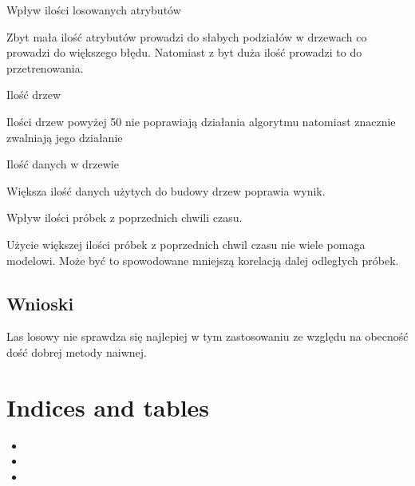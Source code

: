 \documentclass[letterpaper,10pt,english]{sphinxmanual}
\begin{document}
Wpływ ilości losowanych atrybutów

\begin{figure}[htbp]
\centering

\noindent{}
\end{figure}

Zbyt mała ilość atrybutów prowadzi do słabych podziałów w drzewach co prowadzi do większego błędu.
Natomiast z byt duża ilość prowadzi to do przetrenowania.

Ilość drzew

\begin{figure}[htbp]
\centering

\noindent{}
\end{figure}

Ilości drzew powyżej 50 nie poprawiają działania algorytmu natomiast znacznie zwalniają jego działanie

Ilość danych w drzewie

\begin{figure}[htbp]
\centering

\noindent{}
\end{figure}

Większa ilość danych użytych do budowy drzew poprawia wynik.

Wpływ ilości próbek z poprzednich chwili czasu.

\begin{figure}[htbp]
\centering

\noindent{}
\end{figure}

Użycie większej ilości próbek z poprzednich chwil czasu nie wiele pomaga modelowi.
Może być to spowodowane mniejszą korelacją dalej odległych próbek.


\section{Wnioski}
\label{\detokenize{main:wnioski}}
Las losowy nie sprawdza się najlepiej w tym zastosowaniu ze względu na obecność dość dobrej metody naiwnej.


\chapter{Indices and tables}
\label{\detokenize{index:indices-and-tables}}\begin{itemize}
\item {} 

\item {} 

\item {} 

\end{itemize}
\end{document}
